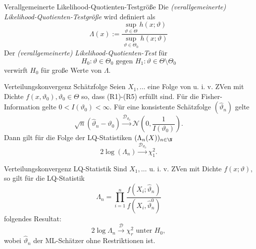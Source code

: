 \begin{karte}{Verallgemeinerte Likelihood-Quotienten-Testgröße}
Die \textit{(verallgemeinerte) Likelihood-Quotienten-Testgröße} wird definiert als 
\[ \Lambda(x) := \frac{ \sup_{\vartheta \in \Theta} h(x;\vartheta) }{ \sup_{\vartheta \in \Theta_0} h(x;\vartheta) } \]
Der \textit{(verallgemeinerte) Likelihood-Quotienten-Test} für 
\[ H_0: \vartheta \in \Theta_0 \text{ gegen } H_1: \vartheta \in \Theta \setminus \Theta_0 \]
verwirft \(H_0\) für große Werte von \(\Lambda\).
\end{karte}

\begin{karte}{Verteilungskonvergenz Schätzfolge}
Seien \(X_1, \ldots\) eine Folge von u. i. v. ZVen mit Dichte \(f(x, \vartheta_0), \vartheta_0 \in \Theta\) so, 
dass (R1)-(R5) erfüllt sind. Für die Fisher-Information gelte \(0 < I(\vartheta_0) < \infty\).
Für eine konsistente Schätzfolge \((\hat{\vartheta}_n)\) gelte 
\[ \sqrt{n}(\hat{\vartheta}_n - \vartheta_0) \overset{\mathcal{D}_{\vartheta_0}}{\longrightarrow} \mathcal{N}\left( 0, \frac{1}{I(\vartheta_0)} \right). \]
Dann gilt für die Folge der LQ-Statistiken \( (\Lambda_n(X))_{n\in\N} \)
\[ 2 \log(\Lambda_n) \overset{\mathcal{D}_{\vartheta_0}}{\longrightarrow} \chi_1^2. \]
\end{karte}

\begin{karte}{Verteilungskonvergenz LQ-Statistik}
Sind \(X_1, \ldots\) u. i. v. ZVen mit Dichte \(f(x;\vartheta)\), so gilt für die LQ-Statistik 
\[ \Lambda_n = \prod_{i=1}^n \frac{f(X_i; \hat{\vartheta}_n)}{f(X_i, \hat{\vartheta}_n^0)} \]
folgendes Resultat:
\[ 2 \log \Lambda_n \overset{\mathcal{D}}{\longrightarrow} \chi_r^2 \text{ unter } H_0, \]
wobei \(\hat{\vartheta}_n\) der ML-Schätzer ohne Restriktionen ist.
\end{karte}